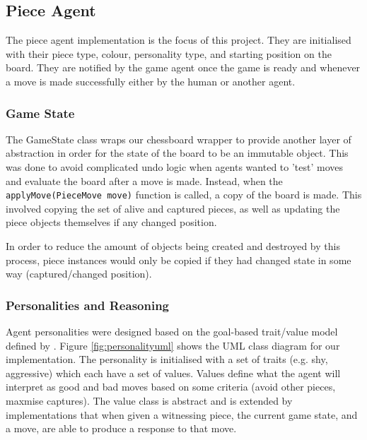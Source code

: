 \documentclass{article}
\begin{document}
\subsection{Piece Agent}

The piece agent implementation is the focus of this project. They are initialised with their piece type, colour, personality type, and starting position on the board. They are notified by the game agent once the game is ready and whenever a move is made successfully either by the human or another agent. 

\subsubsection{Game State}

The GameState class wraps our chessboard wrapper to provide another layer of abstraction in order for the state of the board to be an immutable object. This was done to avoid complicated undo logic when agents wanted to 'test' moves and evaluate the board after a move is made. Instead, when the \lstinline{applyMove(PieceMove move)} function is called, a copy of the board is made. This involved copying the set of alive and captured pieces, as well as updating the piece objects themselves if any changed position. 

In order to reduce the amount of objects being created and destroyed by this process, piece instances would only be copied if they had changed state in some way (captured/changed position). 

\subsubsection{Personalities and Reasoning}

Agent personalities were designed based on the goal-based trait/value model defined by \cite{hetrogenousagents}. Figure \ref{fig:personalityuml} shows the UML class diagram for our implementation. The personality is initialised with a set of traits (e.g. shy, aggressive) which each have a set of values. Values define what the agent will interpret as good and bad moves based on some criteria (avoid other pieces, maxmise captures). The value class is abstract and is extended by implementations that when given a witnessing piece, the current game state, and a move, are able to produce a response to that move.
\end{document}
